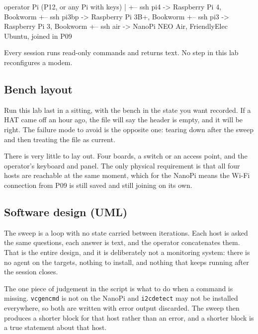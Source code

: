 \begin{asciiart}
operator Pi (P12, or any Pi with keys)
   |
   +-- ssh pi4    -> Raspberry Pi 4,    Bookworm
   +-- ssh pi3bp  -> Raspberry Pi 3B+,  Bookworm
   +-- ssh pi3    -> Raspberry Pi 3,    Bookworm
   +-- ssh air    -> NanoPi NEO Air,    FriendlyElec Ubuntu, joined in P09

Every session runs read-only commands and returns text.
No step in this lab reconfigures a modem.
\end{asciiart}

\subsection*{Bench layout}


Run this lab last in a sitting, with the bench in the state you want recorded. If a HAT came off an hour ago, the file will say the header is empty, and it will be right. The failure mode to avoid is the opposite one: tearing down after the sweep and then treating the file as current.

There is very little to lay out. Four boards, a switch or an access point, and the operator's keyboard and panel. The only physical requirement is that all four hosts are reachable at the same moment, which for the NanoPi means the Wi-Fi connection from P09 is still saved and still joining on its own.

\subsection*{Software design (UML)}


The sweep is a loop with no state carried between iterations. Each host is asked the same questions, each answer is text, and the operator concatenates them. That is the entire design, and it is deliberately not a monitoring system: there is no agent on the targets, nothing to install, and nothing that keeps running after the session closes.

The one piece of judgement in the script is what to do when a command is missing. \texttt{vcgencmd} is not on the NanoPi and \texttt{i2cdetect} may not be installed everywhere, so both are written with error output discarded. The sweep then produces a shorter block for that host rather than an error, and a shorter block is a true statement about that host.

